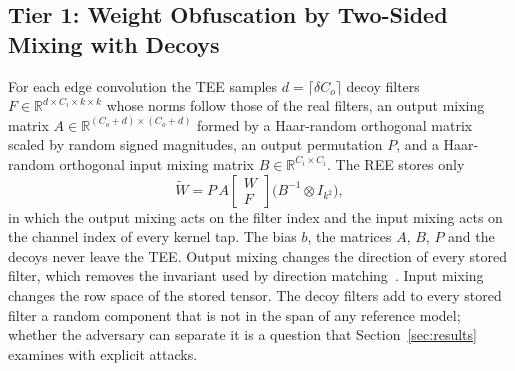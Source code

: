 \documentclass[lettersize,journal]{IEEEtran}
\begin{document}
\subsection{Tier 1: Weight Obfuscation by Two-Sided Mixing with Decoys}
For each edge convolution the TEE samples $d=\lceil \delta C_o\rceil$ decoy filters $F\in\mathbb{R}^{d\times C_i\times k\times k}$ whose norms follow those of the real filters, an output mixing matrix $A\in\mathbb{R}^{(C_o+d)\times(C_o+d)}$ formed by a Haar-random orthogonal matrix scaled by random signed magnitudes, an output permutation $P$, and a Haar-random orthogonal input mixing matrix $B\in\mathbb{R}^{C_i\times C_i}$. The REE stores only
\begin{equation}
\tilde W = P\,A\begin{bmatrix}W\\ F\end{bmatrix}\big(B^{-1}\otimes I_{k^2}\big),
\label{eq:wtilde}
\end{equation}
in which the output mixing acts on the filter index and the input mixing acts on the channel index of every kernel tap. The bias $b$, the matrices $A$, $B$, $P$ and the decoys never leave the TEE. Output mixing changes the direction of every stored filter, which removes the invariant used by direction matching~\cite{wang2025arrows}. Input mixing changes the row space of the stored tensor. The decoy filters add to every stored filter a random component that is not in the span of any reference model; whether the adversary can separate it is a question that Section~\ref{sec:results} examines with explicit attacks.
\end{document}
